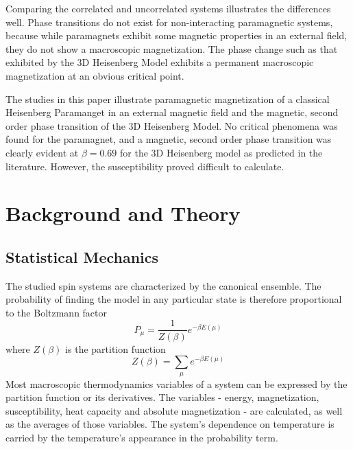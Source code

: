\documentclass[a4paper,12pt]{article}
\begin{document}
Comparing the correlated and uncorrelated systems illustrates the differences well. Phase transitions do not exist for non-interacting paramagnetic systems, because while paramagnets exhibit some magnetic properties in an external field, they do not show a macroscopic magnetization. The phase change such as that exhibited by the 3D Heisenberg Model exhibits a permanent macroscopic magnetization at an obvious critical point.

The studies in this paper illustrate paramagnetic magnetization of a classical Heisenberg Paramanget in an external magnetic field and the magnetic, second order phase transition of the 3D Heisenberg Model. No critical phenomena was found for the paramagnet, and a magnetic, second order phase transition was clearly evident at $\beta = 0.69$ for the 3D Heisenberg model as predicted in the literature. \cite{arxiv1, arxiv2} However, the susceptibility proved difficult to calculate.


\section{Background and Theory}

\subsection{Statistical Mechanics}
The studied spin systems are characterized by the canonical ensemble. The probability of finding the model in any particular state is therefore proportional to the Boltzmann factor
\begin{equation}\label{eq:probability}
		P_\mu = \frac{1}{Z(\beta)}e^{-\beta E(\mu)}
\end{equation}
where $Z(\beta)$ is the partition function
	\begin{equation}\label{eq:partition}
		Z(\beta) = \sum_\mu e^{-\beta E(\mu)}
	\end{equation}
Most macroscopic thermodynamics variables of a system can be expressed by the partition function or its derivatives. The variables - energy, magnetization, susceptibility, heat capacity and absolute magnetization - are calculated, as well as the averages of those variables. The system's dependence on temperature is carried by the temperature's appearance in the probability term.
\end{document}
